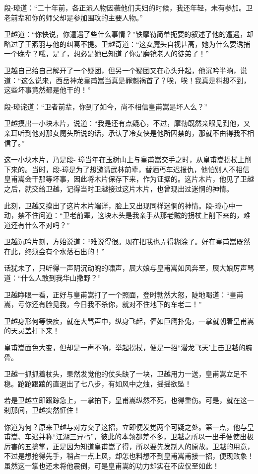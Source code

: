 \documentclass[12pt,oneside]{book}
\begin{document}
段-璋道：``二十年前，各正派人物因袭他们夫妇的时候，我还年轻，未有参加。卫老前辈和你的师父却是参加围攻的主要人物。''

卫越道：``你快说，你遭遇了些什么事情？''铁摩勒简单扼要的叙述了他的遭遇，却略过了王燕羽与他的纠葛不提。卫越奇道：``这女魔头自视甚高，她为什么要诱捕一个晚辈？哦，是了，想必是她已知道了你是磨镜老人的徒弟了！''

卫越自己给自己解开了一个疑团，但另一个疑团又在心头升起，他沉吟半晌，说道：``这么说来，西岳神龙皇甫嵩当真是罪魁祸首了？唉，唉！我真是料想不到，这些坏事竟然都是他干的！''

段-璋诧道：``卫者前辈，你到了如今，尚不相信皇甫嵩是坏人么？''

卫越摸出一小块木片，说道：``我是还有点疑心，不过，摩勒既然亲眼见到他，又亲耳听到他对那女魔头所说的话，承认了冷女侠是他所囚禁的，那就不由得我不相信了。''

这一小块木片，乃是段-
璋当年在玉树山上与皇甫嵩交手之时，从皇甫嵩拐杖上削下来的。当时，段-璋是为了想邀请武林前辈，替酒丐车迟报仇，他怕别人不相信皇甫嵩会干那等坏事，因此将木片保存下来，作为证据的。这片木片，他见了卫越之后，就交给卫越，记得当时卫越接过这片木片，也曾现出过迷惘的神情。

此刻，卫越又摸出了这片木片端详，脸上又出现同样迷惘的神情。段-璋心中一动，禁不住问道：``卫老前辈，这块木头是我亲手从那老贼的拐杖上削下来的，难道还有什么不对吗？''

卫越沉吟片刻，方始说道：``难说得很。现在把我也弄得糊涂了。好在皇甫嵩既然在此，终须会有个水落石出的！''

话犹未了，只听得一声阴沉动魄的啸声，展大娘与皇甫嵩如风奔至，展大娘厉声骂道：``什么人敢到我华山撒野？''

卫越睁眼一看，正好与皇甫嵩打了一个照面，登时勃然大怒，陡地喝道：``皇甫嵩，亏你还有脸见我，今日我不杀你，就对不住地下的车老二！''

卫越身形何等快疾，就在大骂声中，纵身飞起，俨如巨鹰扑兔，一掌就朝着皇甫嵩的天灵盖打下来！

皇甫嵩面色大变，但却是一声不响，举起拐杖，便是一招``潜龙飞天'上击卫越的腕骨。

卫越一抓抓着杖头，果然发觉他的仗头缺了一块，卫越用力一送，皇甫嵩立足不稳。跄跄跟踉的直退出了七八步，有如风中之烛，摇摇欲坠！

若是卫越立即跟踪急上，一掌拍下，皇甫嵩纵然不死，也得重伤。可是，就在这一刹那间，卫越突然怔住！

你道为何？原来卫越与对方交了这招，立即便发觉两个可疑之处。第一点，他与皇甫嵩、车迟并称``江湖三异丐''，彼此的本领都差不多，卫越之所以一出手便使出极厉害的五擒掌，正是因为知道皇甫嵩了得，所以要先发制人的原故。卫越的用意，不过是想抢得先手，稍占一点上风，却怎也料想不到皇甫嵩甫接一招，便现败象！虽然这一掌也还未将他震倒，可是皇甫嵩的功力却实在不应仅至如此！
\end{document}
